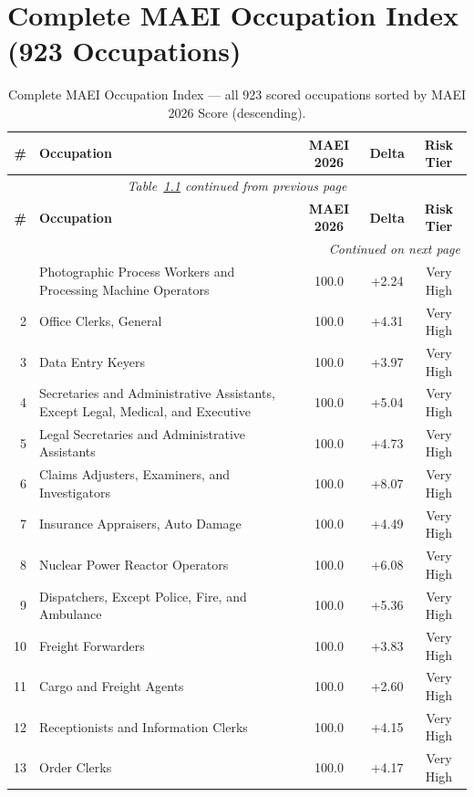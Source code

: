 \chapter{Complete MAEI Occupation Index (923 Occupations)}
\label{chap:appendix_b}

{\small\setlength{\tabcolsep}{4pt}
\begin{longtable}{rp{7cm}ccc}
\caption{Complete MAEI Occupation Index --- all 923 scored occupations sorted by MAEI 2026 Score (descending).} \label{tab:occupation_index} \\
\toprule
\textbf{\#} & \textbf{Occupation} & \textbf{MAEI 2026} & \textbf{Delta} & \textbf{Risk Tier} \\
\midrule
\endfirsthead
\multicolumn{5}{c}{\textit{Table~\ref{tab:occupation_index} continued from previous page}} \\
\toprule
\textbf{\#} & \textbf{Occupation} & \textbf{MAEI 2026} & \textbf{Delta} & \textbf{Risk Tier} \\
\midrule
\endhead
\midrule
\multicolumn{5}{r}{\textit{Continued on next page}} \\
\endfoot
\bottomrule
\endlastfoot
1 & Photographic Process Workers and Processing Machine Operators & 100.0 & +2.24 & Very High \\
2 & Office Clerks, General & 100.0 & +4.31 & Very High \\
3 & Data Entry Keyers & 100.0 & +3.97 & Very High \\
4 & Secretaries and Administrative Assistants, Except Legal, Medical, and Executive & 100.0 & +5.04 & Very High \\
5 & Legal Secretaries and Administrative Assistants & 100.0 & +4.73 & Very High \\
6 & Claims Adjusters, Examiners, and Investigators & 100.0 & +8.07 & Very High \\
7 & Insurance Appraisers, Auto Damage & 100.0 & +4.49 & Very High \\
8 & Nuclear Power Reactor Operators & 100.0 & +6.08 & Very High \\
9 & Dispatchers, Except Police, Fire, and Ambulance & 100.0 & +5.36 & Very High \\
10 & Freight Forwarders & 100.0 & +3.83 & Very High \\
11 & Cargo and Freight Agents & 100.0 & +2.60 & Very High \\
12 & Receptionists and Information Clerks & 100.0 & +4.15 & Very High \\
13 & Order Clerks & 100.0 & +4.17 & Very High \\

\end{longtable}}
